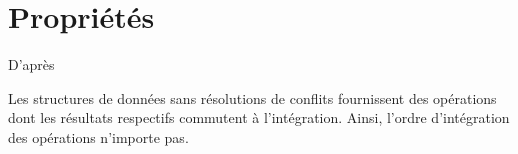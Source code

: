 
\section{Propriétés}
\label{crdts:sec:properties}

D'après~\cite{}

Les structures de données sans résolutions de conflits
fournissent des opérations dont les résultats respectifs commutent à
l'intégration. Ainsi, l'ordre d'intégration des opérations n'importe pas.

